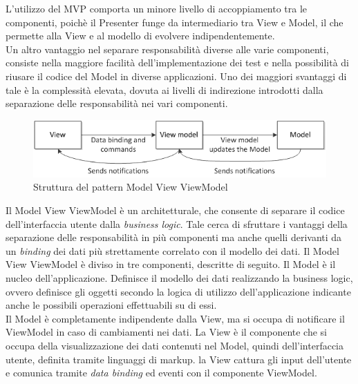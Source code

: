 		L'utilizzo del  MVP comporta un minore livello di accoppiamento tra le componenti, poichè il Presenter funge da intermediario tra View e Model, il che permette alla View e al modello di evolvere indipendentemente. \\
		Un altro vantaggio nel separare responsabilità diverse alle varie componenti, consiste nella maggiore facilità dell'implementazione dei test e nella possibilità di riusare il codice del Model in diverse applicazioni.
		Uno dei maggiori svantaggi di tale  è la complessità elevata, dovuta ai livelli di indirezione introdotti dalla separazione delle responsabilità nei vari componenti. \\


	 \label{app:MVVM}
	\begin{figure}[H]\centering
    \includegraphics[scale=0.7]{SpecificaTecnica/Pics/MVVM}
    \caption{Struttura del pattern Model View ViewModel}
	\end{figure}
	Il Model View ViewModel è un  architetturale, che consente di separare il codice dell'interfaccia utente dalla \textit{business logic}. Tale  cerca di sfruttare i vantaggi della separazione delle responsabilità in più componenti ma anche quelli derivanti da un \textit{binding} dei dati più strettamente correlato con il modello dei dati.
		Il  Model View ViewModel è diviso in tre componenti, descritte di seguito.
			Il Model è il nucleo dell'applicazione. Definisce il modello dei dati realizzando la business logic, ovvero definisce gli oggetti secondo la logica di utilizzo dell'applicazione indicante anche le possibili operazioni effettuabili su di essi.\\ 
			Il Model è completamente indipendente dalla View, ma si occupa di notificare il ViewModel in caso di cambiamenti nei dati.
			La View è il componente che si occupa della visualizzazione dei dati contenuti nel Model, quindi dell'interfaccia utente, definita tramite linguaggi di markup. la View cattura gli input dell'utente e comunica tramite \textit{data binding} ed eventi con il componente ViewModel.
